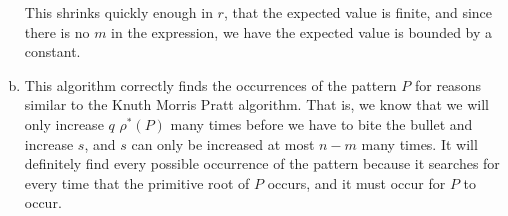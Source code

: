 \documentclass{article}
\begin{document}
\begin{enumerate}[a.]
This shrinks quickly enough in $r$, that the expected value is finite, and since there is no $m$ in the expression, we have the expected value is bounded by a constant.
\item
This algorithm correctly finds the occurrences of the pattern $P$ for reasons similar to the Knuth Morris Pratt algorithm. That is, we know that we will only increase $q$ $\rho^*(P)$ many times before we have to bite the bullet and increase $s$, and $s$ can only be increased at most $n-m$ many times. It will definitely find every possible occurrence of the pattern because it searches for every time that the primitive root of $P$ occurs, and it must occur for $P$ to occur.
\end{enumerate}
\end{document}
